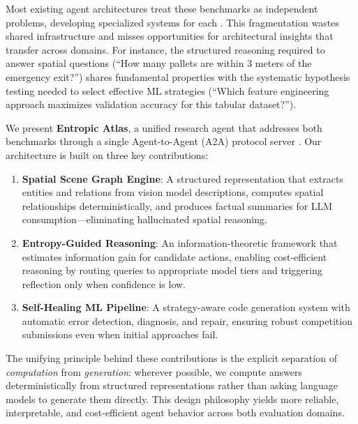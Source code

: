 \documentclass[11pt]{article}
\begin{document}
Most existing agent architectures treat these benchmarks as independent problems, developing specialized systems for each \citep{yang2024sweagent, hong2024opendevin}. This fragmentation wastes shared infrastructure and misses opportunities for architectural insights that transfer across domains. For instance, the structured reasoning required to answer spatial questions (``How many pallets are within 3 meters of the emergency exit?'') shares fundamental properties with the systematic hypothesis testing needed to select effective ML strategies (``Which feature engineering approach maximizes validation accuracy for this tabular dataset?'').

We present \textbf{Entropic Atlas}, a unified research agent that addresses both benchmarks through a single Agent-to-Agent (A2A) protocol server \citep{google2024a2a}. Our architecture is built on three key contributions:

\begin{enumerate}[leftmargin=*,itemsep=2pt]
  \item \textbf{Spatial Scene Graph Engine}: A structured representation that extracts entities and relations from vision model descriptions, computes spatial relationships deterministically, and produces factual summaries for LLM consumption---eliminating hallucinated spatial reasoning.
  \item \textbf{Entropy-Guided Reasoning}: An information-theoretic framework that estimates information gain for candidate actions, enabling cost-efficient reasoning by routing queries to appropriate model tiers and triggering reflection only when confidence is low.
  \item \textbf{Self-Healing ML Pipeline}: A strategy-aware code generation system with automatic error detection, diagnosis, and repair, ensuring robust competition submissions even when initial approaches fail.
\end{enumerate}

The unifying principle behind these contributions is the explicit separation of \emph{computation} from \emph{generation}: wherever possible, we compute answers deterministically from structured representations rather than asking language models to generate them directly. This design philosophy yields more reliable, interpretable, and cost-efficient agent behavior across both evaluation domains.

\end{document}
